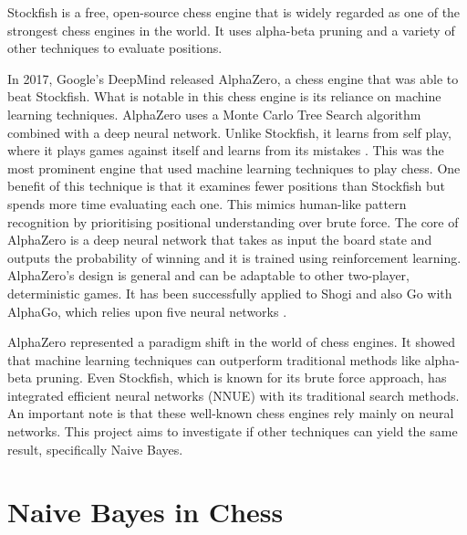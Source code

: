 Stockfish is a free, open-source chess engine that is widely regarded as one of the strongest chess engines in the world. It uses alpha-beta pruning and a variety of other techniques to evaluate positions. 

In 2017, Google's DeepMind released AlphaZero, a chess engine that was able to beat Stockfish. What is notable in this chess engine is its reliance on machine learning techniques. AlphaZero uses a Monte Carlo Tree Search algorithm combined with a deep neural network. Unlike Stockfish, it learns from self play, where it plays games against itself and learns from its mistakes \cite{kleinNeuralNetworksChess2022}. This was the most prominent engine that used machine learning techniques to play chess. One benefit of this technique is that it examines fewer positions than Stockfish but spends more time evaluating each one. This mimics human-like pattern recognition by prioritising positional understanding over brute force. The core of AlphaZero is a deep neural network that takes as input the board state and outputs the probability of winning and it is trained using reinforcement learning. AlphaZero's design is general and can be adaptable to other two-player, deterministic games. It has been successfully applied to Shogi and also Go with AlphaGo, which relies upon five neural networks \cite{kleinNeuralNetworksChess2022}.

AlphaZero represented a paradigm shift in the world of chess engines. It showed that machine learning techniques can outperform traditional methods like alpha-beta pruning. Even Stockfish, which is known for its brute force approach, has integrated efficient neural networks (NNUE) with its traditional search methods. An important note is that these well-known chess engines rely mainly on neural networks. This project aims to investigate if other techniques can yield the same result, specifically Naive Bayes. 


\section{Naive Bayes in Chess}

